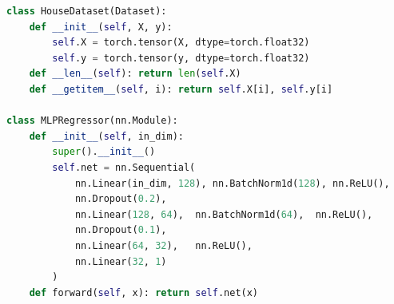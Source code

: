 \documentclass[12pt,a4paper]{article}
\begin{document}
\begin{lstlisting}[language=Python, caption=Custom PyTorch MLPRegressor Class and Dataset]
class HouseDataset(Dataset):
    def __init__(self, X, y):
        self.X = torch.tensor(X, dtype=torch.float32)
        self.y = torch.tensor(y, dtype=torch.float32)
    def __len__(self): return len(self.X)
    def __getitem__(self, i): return self.X[i], self.y[i]

class MLPRegressor(nn.Module):
    def __init__(self, in_dim):
        super().__init__()
        self.net = nn.Sequential( 
            nn.Linear(in_dim, 128), nn.BatchNorm1d(128), nn.ReLU(),
            nn.Dropout(0.2),
            nn.Linear(128, 64),  nn.BatchNorm1d(64),  nn.ReLU(),
            nn.Dropout(0.1),
            nn.Linear(64, 32),   nn.ReLU(),
            nn.Linear(32, 1)
        )
    def forward(self, x): return self.net(x)
\end{lstlisting}
\end{document}
